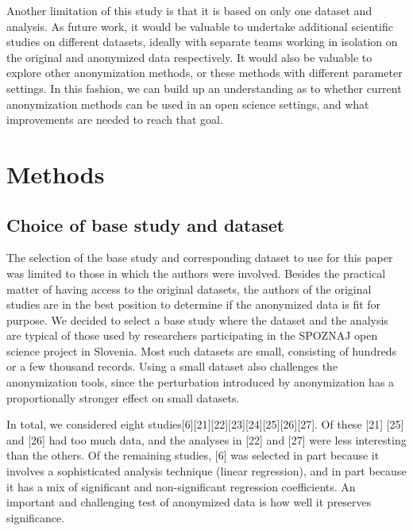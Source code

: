 \documentclass[10pt]{article}
\newcommand{\mycite}[1]{[#1]}
\newcommand{\hlmay}[1]{#1}
\begin{document}
Another limitation of this study is that it is based on only one dataset and analysis. \hlmay{As future work, it would be valuable to undertake additional scientific studies on different datasets, ideally with separate teams working in isolation on the original and anonymized data respectively. It would also be valuable to explore other anonymization methods, or these methods with different parameter settings. In this fashion, we can build up an understanding as to whether current anonymization methods can be used in an open science settings, and what improvements are needed to reach that goal.}



\section*{Methods}

\subsection*{Choice of base study and dataset}
\label{sec:base-study}

The selection of the base study and corresponding dataset to use for this paper was limited to those in which the authors were involved. Besides the practical matter of having access to the original datasets, the authors of the original studies are in the best position to determine if the anonymized data is fit for purpose. We decided to select a base study where the dataset and the analysis are typical of those used by researchers participating in the SPOZNAJ open science project in Slovenia. Most such datasets are small, consisting of hundreds or a few thousand records. Using a small dataset also challenges the anonymization tools, since the perturbation introduced by anonymization has a proportionally stronger effect on small datasets.

In total, we considered eight studies\mycite{6}\mycite{21}\mycite{22}\mycite{23}\mycite{24}\mycite{25}\mycite{26}\mycite{27}. Of these \mycite{21} \mycite{25} and \mycite{26} had too much data, and the analyses in \mycite{22} and \mycite{27} were less interesting than the others. Of the remaining studies, \mycite{6} was selected in part because it involves a sophisticated analysis technique (linear regression), and in part because it has a mix of significant and non-significant regression coefficients. An important and challenging test of  anonymized data is how well it preserves significance.
\end{document}
